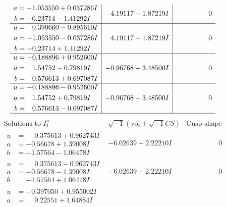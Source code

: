 \documentclass[1p]{elsarticle_modified}
\theoremstyle{definition}
\newcommand{\I}{\sqrt{-1}}
\begin{document}
$$\begin{array}{c|c|c}
\begin{aligned}
a &= -1.053550 + 0.037286 I \\
b &= -0.23714 - 1.41292 I\end{aligned}
 & \phantom{-}4.19117 - 1.87219 I & \phantom{-0.000000 } 0 \\ \hline\begin{aligned}
u &= \phantom{-}0.390660 - 0.895610 I \\
a &= -1.053550 - 0.037286 I \\
b &= -0.23714 + 1.41292 I\end{aligned}
 & \phantom{-}4.19117 + 1.87219 I & \phantom{-0.000000 } 0 \\ \hline\begin{aligned}
u &= -0.188896 + 0.952600 I \\
a &= \phantom{-}1.54752 - 0.79819 I \\
b &= \phantom{-}0.576613 + 0.697087 I\end{aligned}
 & -0.96768 + 3.48500 I & \phantom{-0.000000 } 0 \\ \hline\begin{aligned}
u &= -0.188896 - 0.952600 I \\
a &= \phantom{-}1.54752 + 0.79819 I \\
b &= \phantom{-}0.576613 - 0.697087 I\end{aligned}
 & -0.96768 - 3.48500 I & \phantom{-0.000000 } 0\\
 \hline 
 \end{array}$$\newpage$$\begin{array}{c|c|c}  
\text{Solutions to }I^u_{1}& \I (\text{vol} + \sqrt{-1}CS) & \text{Cusp shape}\\
 \hline 
\begin{aligned}
u &= \phantom{-}0.375613 + 0.962743 I \\
a &= -0.56678 + 1.39008 I \\
b &= -1.57564 - 1.06478 I\end{aligned}
 & -6.02639 - 2.22210 I & \phantom{-0.000000 } 0 \\ \hline\begin{aligned}
u &= \phantom{-}0.375613 - 0.962743 I \\
a &= -0.56678 - 1.39008 I \\
b &= -1.57564 + 1.06478 I\end{aligned}
 & -6.02639 + 2.22210 I & \phantom{-0.000000 } 0 \\ \hline\begin{aligned}
u &= -0.397050 + 0.955002 I \\
a &= \phantom{-}0.22551 + 1.64884 I \\

\end{aligned}
\end{array}$$
\end{document}
